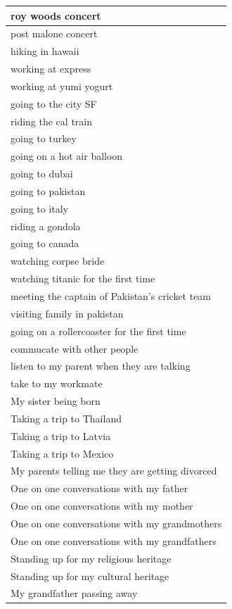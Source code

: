 \documentclass[
  .7em,
  letterpaper,
  DIV=11,
  numbers=noendperiod]{scrartcl}
\begin{document}
\begin{table}
\begin{tabular}{l}
\hline
roy woods concert\\
\hline
post malone concert\\
\hline
hiking in hawaii\\
\hline
working at express\\
\hline
working at yumi yogurt\\
\hline
going to the city SF\\
\hline
riding the cal train\\
\hline
going to turkey\\
\hline
going on a hot air balloon\\
\hline
going to dubai\\
\hline
going to pakistan\\
\hline
going to italy\\
\hline
riding a gondola\\
\hline
going to canada\\
\hline
watching corpse bride\\
\hline
watching titanic for the first time\\
\hline
meeting the captain of Pakistan's cricket team\\
\hline
visiting family in pakistan\\
\hline
going on a rollercoaster for the first time\\
\hline
commucate with other people\\
\hline
listen to my parent when they are talking\\
\hline
take to my workmate\\
\hline
My sister being born\\
\hline
Taking a trip to Thailand\\
\hline
Taking a trip to Latvia\\
\hline
Taking a trip to Mexico\\
\hline
My parents telling me they are getting divorced\\
\hline
One on one conversations with my father\\
\hline
One on one conversations with my mother\\
\hline
One on one conversations with my grandmothers\\
\hline
One on one conversations with my grandfathers\\
\hline
Standing up for my religious heritage\\
\hline
Standing up for my cultural heritage\\
\hline
My grandfather passing away\\

\end{tabular}
\end{table}
\end{document}
